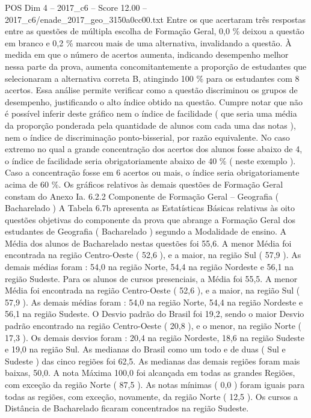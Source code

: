 \begin{textsample}{POS Dim 4 – 2017\_c6 – Score 12.00 – 2017\_c6/enade\_2017\_geo\_3150a0cc00.txt}
Entre os que acertaram três respostas entre as questões de múltipla escolha de Formação Geral, 0,0 \% deixou a questão em branco e 0,2 \% marcou mais de uma alternativa, invalidando a questão.
À medida em que o número de acertos aumenta, indicando desempenho melhor nessa parte da prova, aumenta concomitantemente a proporção de estudantes que selecionaram a alternativa correta B, atingindo 100 \% para os estudantes com 8 acertos.
Essa análise permite verificar como a questão discriminou os grupos de desempenho, justificando o alto índice obtido na questão.
Cumpre notar que não é possível inferir deste gráfico nem o índice de facilidade ( que seria uma média da proporção ponderada pela quantidade de alunos com cada uma das notas ), nem o índice de discriminação ponto-bisserial, por razão equivalente.
No caso extremo no qual a grande concentração dos acertos dos alunos fosse abaixo de 4, o índice de facilidade seria obrigatoriamente abaixo de 40 \% ( neste exemplo ).
Caso a concentração fosse em 6 acertos ou mais, o índice seria obrigatoriamente acima de 60 \%.
Os gráficos relativos às demais questões de Formação Geral constam do Anexo Ia. 6.2.2 Componente de Formação Geral – Geografia ( Bacharelado ) A Tabela 6.7b apresenta as Estatísticas Básicas relativas às oito questões objetivas do componente da prova que abrange a Formação Geral dos estudantes de Geografia ( Bacharelado ) segundo a Modalidade de ensino.
A Média dos alunos de Bacharelado nestas questões foi 55,6.
A menor Média foi encontrada na região Centro-Oeste ( 52,6 ), e a maior, na região Sul ( 57,9 ).
As demais médias foram : 54,0 na região Norte, 54,4 na região Nordeste e 56,1 na região Sudeste.
Para os alunos de cursos presenciais, a Média foi 55,5.
A menor Média foi encontrada na região Centro-Oeste ( 52,6 ), e a maior, na região Sul ( 57,9 ).
As demais médias foram : 54,0 na região Norte, 54,4 na região Nordeste e 56,1 na região Sudeste.
O Desvio padrão do Brasil foi 19,2, sendo o maior Desvio padrão encontrado na região Centro-Oeste ( 20,8 ), e o menor, na região Norte ( 17,3 ).
Os demais desvios foram : 20,4 na região Nordeste, 18,6 na região Sudeste e 19,0 na região Sul.
As medianas do Brasil como um todo e de duas ( Sul e Sudeste ) das cinco regiões foi 62,5.
As medianas das demais regiões foram mais baixas, 50,0.
A nota Máxima 100,0 foi alcançada em todas as grandes Regiões, com exceção da região Norte ( 87,5 ).
As notas mínimas ( 0,0 ) foram iguais para todas as regiões, com exceção, novamente, da região Norte ( 12,5 ).
Os cursos a Distância de Bacharelado ficaram concentrados na região Sudeste.

\end{textsample}
